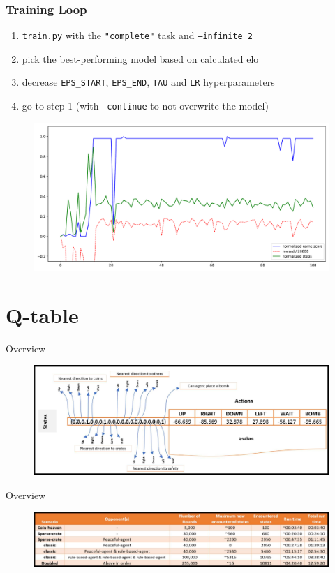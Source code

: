 \documentclass{beamer}
\begin{document}
\begin{frame}[fragile]
	\frametitle{Training Loop}
	\pause

	\begin{enumerate}
			\item \texttt{train.py} with the \texttt{"complete"} task and \texttt{--infinite 2}
			\item pick the best-performing model based on calculated elo
			\item decrease \texttt{EPS\_START}, \texttt{EPS\_END}, \texttt{TAU} and \texttt{LR} hyperparameters
			\item go to step 1 (with \texttt{--continue} to not overwrite the model)
	\end{enumerate}

	\pause
	\begin{figure}[t]
			\centering
			\includegraphics[width=.8\linewidth]{coins.pdf}
	\end{figure}
\end{frame}

\section{Q-table}

\begin{frame}{Overview}
	\pause
	\begin{figure}[t]
			\centering
			\includegraphics[width=.8\linewidth]{a.pdf}
	\end{figure}
\end{frame}

\begin{frame}{Overview}
	\pause
	\begin{figure}[t]
			\centering
			\includegraphics[width=.8\linewidth]{b.pdf}
	\end{figure}
\end{frame}
\end{document}

